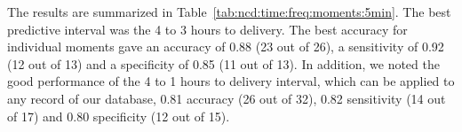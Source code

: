 The results are summarized in Table~\ref{tab:ncd:time:freq:moments:5min}. The best predictive interval was the 4 to 3 hours to delivery. The best accuracy for individual moments gave an accuracy of 0.88  (23 out of 26), a sensitivity of 0.92 (12 out of 13) and a specificity of 0.85 (11 out of 13). In addition, we noted the good performance of the 4 to 1 hours to delivery interval, which  can be applied to any record of our database, 0.81 accuracy (26 out of 32), 0.82 sensitivity (14 out of 17) and 0.80 specificity (12 out of 15).






